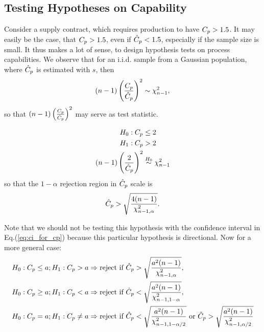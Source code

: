 \subsection{Testing Hypotheses on Capability}
Consider a supply contract, which requires production to have $C_p>1.5$. 
It may easily be the case, that $C_p>1.5$, even if $\hat{C}_p<1.5$, especially if the sample size is small.
It thus makes a lot of sense, to design hypothesis tests on process capabilities. 
We observe that for an i.i.d. sample from a Gaussian population, where $\hat{C}_p$ is estimated with $s$, then
\begin{align}
\label{eq:cp_dist}
	(n-1) \left( \frac{C_p}{\hat{C}_p} \right)^2  \sim \chi^2_{n-1},
\end{align} 
so that $(n-1) \left( \frac{C_p}{\hat{C}_p} \right)^2 $ may serve as test statistic.

\begin{example}
\begin{align*}
	H_0: C_p &\leq 2	\\
	H_1:C_p &> 2 \\
	(n-1) \left( \frac{2}{\hat{C}_p} \right)^2  &\overset{H_0}{\sim} \chi^2_{n-1}
\end{align*}
so that the $1-\alpha$ rejection region in $\hat{C}_p$ scale is 
\begin{align*}
	\hat{C}_p > \sqrt{\frac{4 (n-1)}{\chi^2_{n-1,\alpha}}} .
\end{align*}
\end{example}
Note that we should not be testing this hypothesis with the confidence interval in Eq.(\ref{eq:ci_for_cp}) because this particular hypothesis is directional.
Now for a more general case:
\begin{align*}
	H_0: C_p \leq a; 
	H_1:C_p > a 
	&\Rightarrow \text{reject if } \hat{C}_p > \sqrt{\frac{a^2 (n-1)}{\chi^2_{n-1,\alpha}}},\\
	H_0: C_p \geq  a; 
	H_1:C_p < a 
	&\Rightarrow \text{reject if } \hat{C}_p < \sqrt{\frac{a^2 (n-1)}{\chi^2_{n-1,1-\alpha}}}, \\
	H_0: C_p =  a; 
	H_1:C_p \neq a 
	&\Rightarrow \text{reject if } \hat{C}_p < \sqrt{\frac{a^2 (n-1)}{\chi^2_{n-1,1-\alpha/2}}}
	\text{ or } \hat{C}_p > \sqrt{\frac{a^2 (n-1)}{\chi^2_{n-1,\alpha/2}}} \\
\end{align*}














